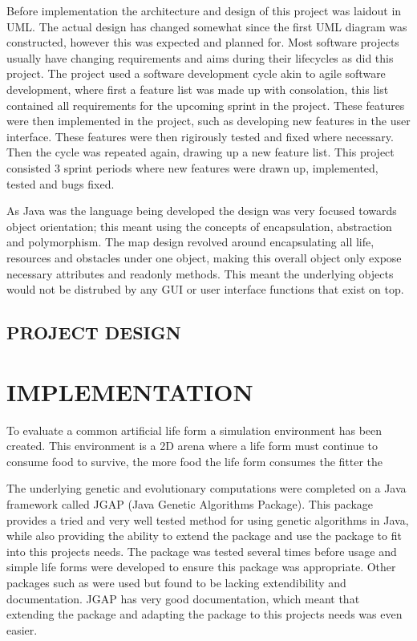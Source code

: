 \documentclass[10pt,twocolumn]{article}
\begin{document}
Before implementation the architecture and design of this project was laidout in UML. The actual design has changed somewhat since the first UML diagram was
constructed, however this was expected and planned for. Most software projects usually have changing requirements and aims during their lifecycles as did this
project. The project used a software development cycle akin to agile software development, where first a feature list was made up with consolation, this list
contained all requirements for the upcoming sprint in the project. These features were then implemented in the project, such as developing new features in the
user interface. These features were then rigirously tested and fixed where necessary. Then the cycle was repeated again, drawing up a new feature list.
This project consisted 3 sprint periods where new features were drawn up, implemented, tested and bugs fixed.

As Java was the language being developed the design was very focused towards object orientation; this meant using the concepts of encapsulation, abstraction
and polymorphism. The map design revolved around encapsulating all life, resources and obstacles under one object, making this overall object only expose 
necessary attributes and readonly methods. This meant the underlying objects would not be distrubed by any GUI or user interface functions that exist on top.  

\subsection{PROJECT DESIGN}



\section{IMPLEMENTATION}
To evaluate a common artificial life form a simulation environment has been created.
This environment is a 2D arena where a life form must continue to consume food to survive, the more food the life form consumes the fitter the  

The underlying genetic and evolutionary computations were completed on a Java framework called JGAP (Java Genetic Algorithms Package).
This package provides a tried and very well tested method for using genetic algorithms in Java, while also providing the 
ability to extend the package and use the package to fit into this projects needs. The package was tested several times before usage
and simple life forms were developed to ensure this package was appropriate. Other packages such as %
were used but found to be lacking extendibility and documentation. JGAP has very good documentation, which meant that extending
the package and adapting the package to this projects needs was even easier.
\end{document}

